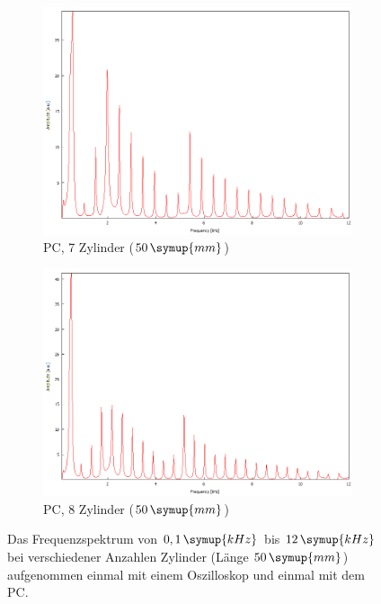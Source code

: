 \begin{figure}
\begin{subfigure}[b]{0.3\textwidth}
        \includegraphics[width=\textwidth]{data/1_2zylinder50mmPC/7.png}
        \caption{PC, 7 Zylinder ($50 \, \symup{mm}$)}
    \end{subfigure}
    \hfill
    \begin{subfigure}[b]{0.3\textwidth}
        \centering
        \includegraphics[width=\textwidth]{data/1_2zylinder50mmPC/8.png}
        \caption{PC, 8 Zylinder ($50 \, \symup{mm}$)}
    \end{subfigure}
       \caption{Das Frequenzspektrum von $0,1 \, \symup{kHz}$ bis $12 \, \symup{kHz}$ bei verschiedener Anzahlen Zylinder (Länge $50 \, \symup{mm}$) aufgenommen einmal mit einem Oszilloskop und einmal mit dem PC.}
       \label{fig:anhang2}
\end{figure}

